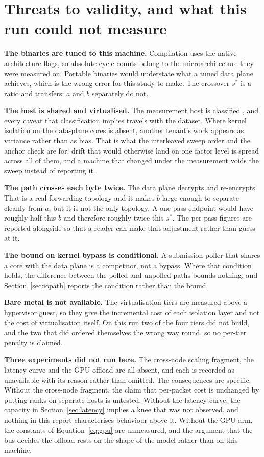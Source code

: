 \section{Threats to validity, and what this run could not measure}
\label{sec:threats}

\noindent\textbf{The binaries are tuned to this machine.}
Compilation uses the native architecture flags, so absolute cycle counts belong
to the microarchitecture they were measured on. Portable binaries would
understate what a tuned data plane achieves, which is the wrong error for this
study to make. The crossover $s^{*}$ is a ratio and transfers; $a$ and $b$
separately do not.

\noindent\textbf{The host is shared and virtualised.}
The measurement host is classified \envHostClass, and every caveat that
classification implies travels with the dataset. Where kernel isolation on the
data-plane cores is absent, another tenant's work appears as variance rather
than as bias. That is what the interleaved sweep order and the anchor check are
for: drift that would otherwise land on one factor level is spread across all of
them, and a machine that changed under the measurement voids the sweep instead
of reporting it.

\noindent\textbf{The path crosses each byte twice.}
The data plane decrypts and re-encrypts. That is a real forwarding topology and
it makes $b$ large enough to separate cleanly from $a$, but it is not the only
topology. A one-pass endpoint would have roughly half this $b$ and therefore
roughly twice this $s^{*}$. The per-pass figures are reported alongside so that
a reader can make that adjustment rather than guess at it.

\noindent\textbf{The bound on kernel bypass is conditional.}
A submission poller that shares a core with the data plane is a competitor, not
a bypass. Where that condition holds, the difference between the polled and
unpolled paths bounds nothing, and Section~\ref{sec:iopath} reports the
condition rather than the bound.

\noindent\textbf{Bare metal is not available.}
The virtualisation tiers are measured above a hypervisor guest, so they give the
incremental cost of each isolation layer and not the cost of virtualisation
itself. On this run two of the four tiers did not build, and the two that did
ordered themselves the wrong way round, so no per-tier penalty is claimed.

\noindent\textbf{Three experiments did not run here.}
The cross-node scaling fragment, the latency curve and the GPU offload are all
absent, and each is recorded as unavailable with its reason rather than omitted.
The consequences are specific. Without the cross-node fragment, the claim that
per-packet cost is unchanged by putting ranks on separate hosts is untested.
Without the latency curve, the capacity in Section~\ref{sec:latency} implies a
knee that was not observed, and nothing in this report characterises behaviour
above it. Without the GPU arm, the constants of Equation~\ref{eq:gpu} are
unmeasured, and the argument that the bus decides the offload rests on the shape
of the model rather than on this machine.

